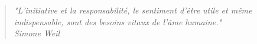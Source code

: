 \pagebreak
\hspace{0pt}
\vfill
\begin{quote}
\centering \textit{"L'initiative et la responsabilité, le sentiment d'être utile et même indispensable,
sont des besoins vitaux de l'âme humaine." \\
Simone Weil}
\end{quote}
\vfill
\hspace{0pt}

\pagebreak